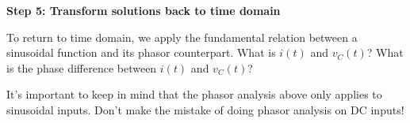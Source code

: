 \begin{enumerate}
\qitem \textbf{Step 5: Transform solutions back to time domain}

To return to time domain, we apply the fundamental relation between a sinusoidal function and its phasor counterpart.
What is $i(t)$ and $v_C(t)$? What is the phase difference between $i(t)$ and $v_C(t)$? 



\end{enumerate}

It's important to keep in mind that the phasor analysis above only applies to
sinusoidal inputs. Don't make the mistake of doing phasor analysis on DC inputs!